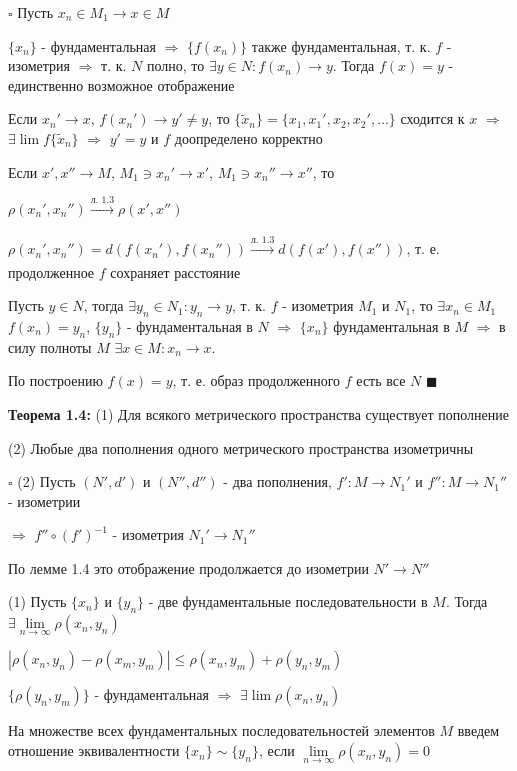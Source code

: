 \documentclass[a4paper]{report}
\begin{document}
\noindent $\square$ Пусть $x_n\in M_1\to x\in M$

$\{x_n\}$ - фундаментальная $\Rightarrow$ $\{f(x_n)\}$ также фундаментальная, т. к. $f$ - изометрия $\Rightarrow$ т. к.
$N$ полно, то $\exists y\in N\colon f(x_n)\to y$. Тогда $f(x)=y$ - единственно возможное отображение

Если $x_n'\to x$, $f(x_n')\to y'\ne y$, то $\{\tilde x_n\}=\{x_1,x_1',x_2,x_2',\ldots\}$ сходится к $x$ $\Rightarrow$
$\exists\lim f\{\tilde x_n\}$ $\Rightarrow$ $y'=y$ и $f$ доопределено корректно

Если $x',x''\to M$, $M_1\ni x_n'\to x'$, $M_1\ni x_n''\to x''$, то

$\rho(x_n',x_n'')\xrightarrow[]{\text{л. 1.3}}\rho(x',x'')$

$\rho(x_n',x_n'')=d(f(x_n'),f(x_n''))\xrightarrow[]{\text{л. 1.3}}d(f(x'),f(x''))$, т. е. продолженное $f$ сохраняет расстояние

Пусть $y\in N$, тогда $\exists y_n\in N_1\colon y_n\to y$, т. к. $f$ - изометрия $M_1$ и $N_1$, то $\exists x_n\in M_1$
$f(x_n)=y_n$, $\{y_n\}$ - фундаментальная в $N$ $\Rightarrow$ $\{x_n\}$ фундаментальная в $M$ $\Rightarrow$ в силу
полноты $M$ $\exists x\in M\colon x_n\to x$.

По построению $f(x)=y$, т. е. образ продолженного $f$ есть все $N$ $\blacksquare$
\bigskip

\noindent\textbf{Теорема 1.4:} (1) Для всякого метрического пространства существует пополнение

(2) Любые два пополнения одного метрического пространства изометричны

\noindent $\square$ (2) Пусть $(N',d')$ и $(N'',d'')$ - два пополнения, $f'\colon M\to N_1'$ и $f''\colon M\to N_1''$ - изометрии

$\Rightarrow$ $f''\circ(f')^{-1}$ - изометрия $N_1'\to N_1''$

По лемме 1.4 это отображение продолжается до изометрии $N'\to N''$

(1) Пусть $\{x_n\}$ и $\{y_n\}$ - две фундаментальные последовательности в $M$. Тогда $\exists\lim\limits_{n\to\infty}\rho(x_n,y_n)$

$|\rho(x_n,y_n)-\rho(x_m,y_m)|\le\rho(x_n,y_m)+\rho(y_n,y_m)$

$\{\rho(y_n,y_m)\}$  - фундаментальная $\Rightarrow$ $\exists\lim\rho(x_n,y_n)$

На множестве всех фундаментальных последовательностей элементов $M$ введем отношение эквивалентности $\{x_n\}\sim\{y_n\}$,
если $\lim\limits_{n\to\infty}\rho(x_n,y_n)=0$
\end{document}
